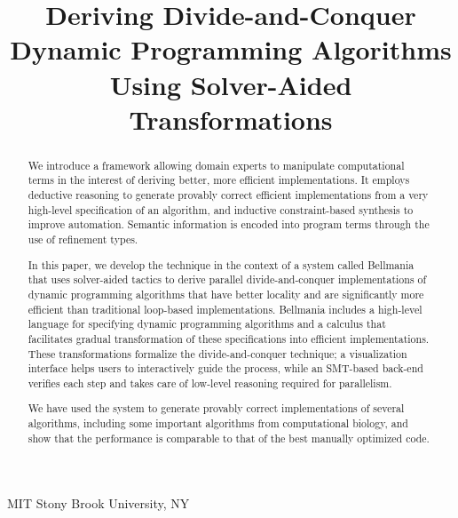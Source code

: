 \documentclass[10pt,numbers]{sigplanconf}
\begin{document}




\title{Deriving Divide-and-Conquer Dynamic Programming Algorithms Using 
  Solver-Aided Transformations}

           {MIT}
           {\vspace{-2em}}
           {Stony Brook University, NY}
           {}

\maketitle

\begin{abstract}
We introduce a framework allowing domain experts
to manipulate computational terms
in the interest of deriving better, more efficient implementations.
It employs deductive reasoning to generate provably correct efficient implementations from a very high-level specification of an algorithm,
and inductive constraint-based synthesis to improve automation.
Semantic information is encoded into program terms through the use of refinement types.

In this paper, we develop the technique in the context of a system called Bellmania that uses solver-aided tactics to derive parallel divide-and-conquer implementations of dynamic programming algorithms that have better locality and are significantly more efficient than traditional loop-based implementations. Bellmania includes a high-level language for specifying dynamic programming algorithms and a calculus that facilitates gradual transformation of these specifications into efficient implementations.
These transformations formalize the divide-and-conquer technique; a visualization interface helps users to interactively guide the process,
while an SMT-based back-end verifies each step
and takes care of low-level reasoning required for parallelism.

We have used the system to generate provably correct implementations of several algorithms, including some important algorithms from computational biology, and show that the performance is comparable to that of the best manually optimized code.
\end{abstract}
\end{document}
